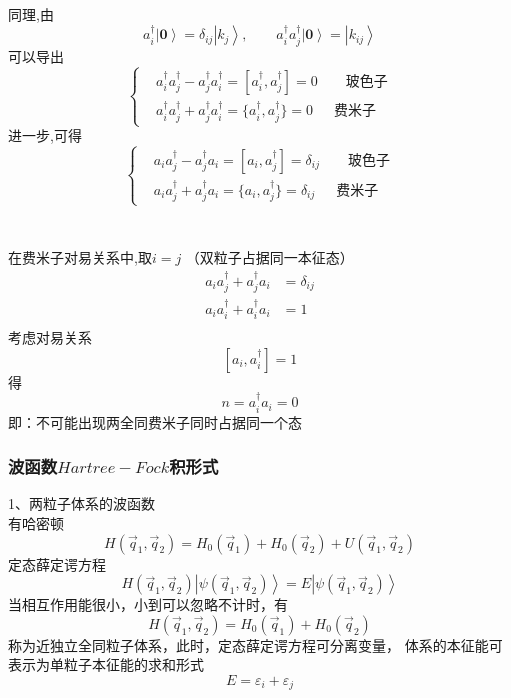 \begin{frame}[label=current]
  \frametitle{}
同理,由
\[ a_i^{\dagger} \left\vert \mathbf{0} \right\rangle = \delta _{ij} \left\vert  k_j \right\rangle, \qquad a_i^{\dagger} a_j^{\dagger} \left\vert \mathbf{0} \right\rangle = \left\vert  k_{ij} \right\rangle \]
可以导出
\[\left\{ \begin{aligned}
  &a_i ^{\dagger} a_j ^{\dagger} - a_j ^{\dagger} a_i ^{\dagger} = [a_i ^{\dagger}, a_j ^{\dagger}] = 0 \qquad \text{玻色子} \\
  &a_i ^{\dagger} a_j ^{\dagger} + a_j ^{\dagger} a_i ^{\dagger} = \{ a_i ^{\dagger}, a_j ^{\dagger}\} = 0 \quad \,\,\, \text{费米子} 
\end{aligned}\right.\]
进一步,可得
\[\left\{ \begin{aligned}
  &a_i  a_j ^{\dagger} - a_j ^{\dagger} a_i  = [a_i , a_j ^{\dagger}] = \delta _{ij} \qquad \text{玻色子} \\
  &a_i  a_j ^{\dagger} + a_j ^{\dagger} a_i = \{ a_i , a_j ^{\dagger}\} = \delta _{ij} \quad \,\,\, \text{费米子} 
\end{aligned}\right.\]

\end{frame} 

\begin{frame}[label=current]
  \frametitle{}
\emf[泡利不相容原理：] \\ 
在费米子对易关系中,取$i=j$ （双粒子占据同一本征态）
\[ \begin{aligned}
  a_i  a_j ^{\dagger} + a_j ^{\dagger} a_i &=  \delta _{ij}  \\
  a_i  a_i ^{\dagger} + a_i ^{\dagger} a_i &=  1  \\
\end{aligned}\]
考虑对易关系  
\[ [a_i, a_i ^{\dagger}] = 1\]
得
\[ n =  a_i ^{\dagger} a_i =0 \]
即：不可能出现两全同费米子同时占据同一个态
\end{frame} 

\begin{frame}[label=current]
  \frametitle{波函数$Hartree-Fock$积形式}
1、两粒子体系的波函数 \\
有哈密顿
\[ H(\vec{q}_1,\vec{q}_2) = H_0(\vec{q}_1) + H_0(\vec{q}_2) +  U(\vec{q}_1, \vec{q}_2)\]
定态薛定谔方程
\[ H(\vec{q}_1,\vec{q}_2) \left \vert\psi(\vec{q}_1,\vec{q}_2) \right\rangle = E \left\vert \psi(\vec{q}_1,\vec{q}_2) \right\rangle \]
当相互作用能很小，小到可以忽略不计时，有
\[ H(\vec{q}_1,\vec{q}_2) = H_0(\vec{q}_1) + H_0(\vec{q}_2) \]
称为近独立全同粒子体系，此时，定态薛定谔方程可分离变量，
体系的本征能可表示为单粒子本征能的求和形式
  \[ E= \varepsilon _i + \varepsilon _j\]
\end{frame} 

